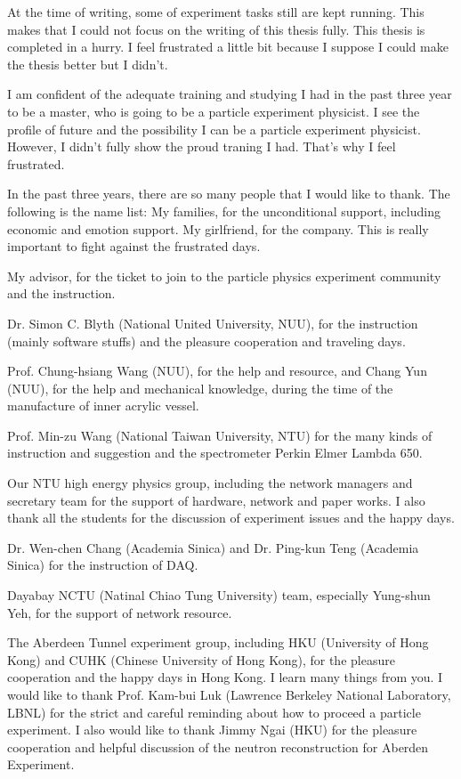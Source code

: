 \begin{acknowledgements}

At the time of writing, some of experiment tasks still are kept running.
This makes that I could not focus on the writing of this thesis fully.
This thesis is completed in a hurry. I feel frustrated a little bit because I suppose
I could make the thesis better but I didn't.

I am confident of the adequate training and studying I had in the past three year
to be a master, who is going to be a particle experiment physicist.
I see the profile of future and the possibility I can be a particle experiment physicist.
However, I didn't fully show the proud traning I had. That's why I feel frustrated.


In the past three years, there are so many people that I would like to thank.
The following is the name list:
My families, for the unconditional support, including
economic and emotion support.
My girlfriend, for the company. This is really important
to fight against the frustrated days.

My advisor, for the ticket to join to the particle physics
experiment community and the instruction.

Dr. Simon C. Blyth (National United University, NUU), for the instruction (mainly software stuffs) and the
pleasure cooperation and traveling days.

Prof. Chung-hsiang Wang (NUU), for the help and resource,
and Chang Yun (NUU), for the help and mechanical knowledge, during the time of
the manufacture of inner acrylic vessel.

Prof. Min-zu Wang (National Taiwan University, NTU) for the many kinds of instruction and suggestion
and the spectrometer Perkin Elmer Lambda 650.

Our NTU high energy physics group, including the network managers and secretary team
for the support of hardware, network and paper works. I also thank all
the students for the discussion of experiment issues and the happy days.

Dr. Wen-chen Chang (Academia Sinica) and Dr. Ping-kun Teng (Academia Sinica)
for the instruction of DAQ.

Dayabay NCTU (Natinal Chiao Tung University) team, especially Yung-shun Yeh, for the support of network resource.

The Aberdeen Tunnel experiment group, including HKU (University of Hong Kong) and CUHK (Chinese University of Hong Kong),
for the pleasure cooperation and the happy days in Hong Kong. I learn many things from you.
I would like to thank Prof. Kam-bui Luk (Lawrence Berkeley National Laboratory, LBNL) for the strict and careful reminding about
how to proceed a particle experiment. I also would like to thank Jimmy Ngai (HKU) for the
pleasure cooperation and helpful discussion of the neutron reconstruction for Aberden Experiment.


\end{acknowledgements}
